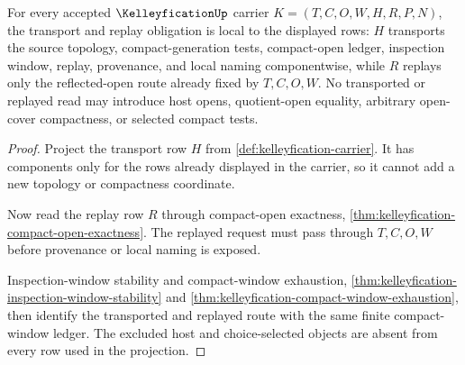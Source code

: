 \begin{theorem}
\label{thm:kelleyfication-transport-replay-obligation}
For every accepted $\KelleyficationUp$ carrier $K=(T,C,O,W,H,R,P,N)$, the transport and replay obligation is local to the displayed rows: $H$ transports the source topology, compact-generation tests, compact-open ledger, inspection window, replay, provenance, and local naming componentwise, while $R$ replays only the reflected-open route already fixed by $T,C,O,W$. No transported or replayed read may introduce host opens, quotient-open equality, arbitrary open-cover compactness, or selected compact tests.
\end{theorem}
\begin{proof}
Project the transport row $H$ from \autoref{def:kelleyfication-carrier}. It has components only for the rows already displayed in the carrier, so it cannot add a new topology or compactness coordinate.

Now read the replay row $R$ through compact-open exactness, \autoref{thm:kelleyfication-compact-open-exactness}. The replayed request must pass through $T,C,O,W$ before provenance or local naming is exposed.

Inspection-window stability and compact-window exhaustion, \autoref{thm:kelleyfication-inspection-window-stability} and \autoref{thm:kelleyfication-compact-window-exhaustion}, then identify the transported and replayed route with the same finite compact-window ledger. The excluded host and choice-selected objects are absent from every row used in the projection.
\end{proof}

